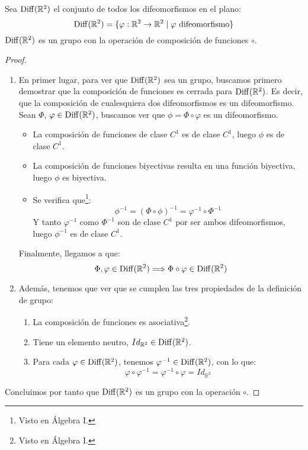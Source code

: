 \begin{prop}
    Sea $\operatorname{Diff}(\mathbb{R}^2)$ el conjunto de todos los difeomorfismos en el plano:
\begin{equation*}
    \Diff(\mathbb{R}^2) = \{\varphi:\mathbb{R}^2\rightarrow\mathbb{R}^2 \mid \varphi \text{\ difeomorfismo}\}
\end{equation*}
$\operatorname{Diff}(\mathbb{R}^2)$ es un grupo con la operación de composición de funciones $\circ$.
\begin{proof}\ 
    \begin{enumerate}
        \item En primer lugar, para ver que $\operatorname{Diff}(\mathbb{R}^2)$ sea un grupo, buscamos primero demostrar que la composición de funciones es cerrada para $\operatorname{Diff}(\mathbb{R}^2)$. Es decir, que la composición de cualesquiera dos difeomorfismos es un difeomorfismo.\\

            Sean $\Phi$, $\varphi \in \operatorname{Diff}(\mathbb{R}^2)$, buscamos ver que $\phi = \Phi \circ \varphi$ es un difeomorfismo.
\begin{itemize}
    \item La composición de funciones de clase $C^1$ es de clase $C^1$, luego $\phi$ es de clase $C^1$.
    \item La composición de funciones biyectivas resulta en una función biyectiva, luego $\phi$ es biyectiva.
    \item Se verifica que\footnote{Visto en Álgebra I.}:
        \begin{equation*}
            \phi^{-1} = {(\Phi \circ \phi)}^{-1} = \varphi^{-1} \circ \Phi^{-1}
        \end{equation*}
        Y tanto $\varphi^{-1}$ como $\Phi^{-1}$ son de clase $C^1$ por ser ambos difeomorfismos, luego $\phi^{-1}$ es de clase $C^1$.
\end{itemize}
Finalmente, llegamos a que:
\begin{equation*}
    \Phi, \varphi \in \operatorname{Diff}(\mathbb{R}^2) \Longrightarrow \Phi \circ \varphi \in \operatorname{Diff}(\mathbb{R}^2)
\end{equation*}
    \item Además, tenemos que ver que se cumplen las tres propiedades de la definición de grupo:
        \begin{enumerate}[label=(\arabic*)]
        \item La composición de funciones es asociativa\footnote{Visto en Álgebra I.}.
        \item Tiene un elemento neutro, $Id_{\mathbb{R}^2}\in \operatorname{Diff}(\mathbb{R}^2)$.
        \item Para cada $\varphi \in \operatorname{Diff}(\mathbb{R}^2)$, tenemos $\varphi^{-1}\in \operatorname{Diff}(\mathbb{R}^2)$, con lo que:
            \begin{equation*}
                \varphi \circ \varphi^{-1} = \varphi^{-1} \circ \varphi = Id_{\mathbb{R}^2}
            \end{equation*}
        \end{enumerate}
\end{enumerate}
Concluimos por tanto que $\operatorname{Diff}(\mathbb{R}^2)$ es un grupo con la operación $\circ$.
\end{proof}
\end{prop}
